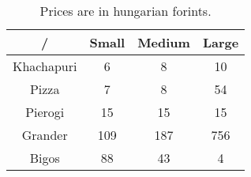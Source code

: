 \begin{table}[h]
\centering
\begin{tabular}{|c | c | c | c|} 
 \hline
 / & Small & Medium & Large \\ [0.5ex] 
 \hline\hline
 Khachapuri & 6 & 8 & 10 \\ 
 \hline
 Pizza & 7 & 8 & 54 \\
 \hline
 Pierogi & 15 & 15 & 15 \\
 \hline
 Grander & 109 & 187 & 756 \\
 \hline
 Bigos & 88 & 43 & 4 \\
 \hline
\end{tabular}
\label{tab:dish_prices}
\caption{Prices are in hungarian forints.}
\end{table}